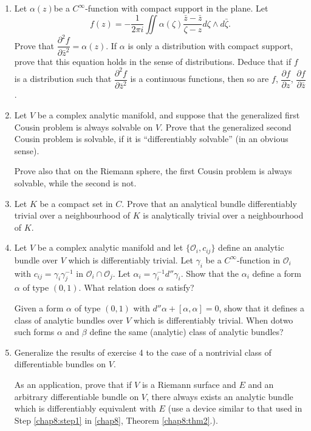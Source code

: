 \begin{enumerate}
\item Let $\alpha (z)$\pageoriginale be a $C^\infty$-function with
  compact support in the plane. Let  
$$
f(z) = - \frac{1}{2 \pi i} \iint \alpha (\zeta) \frac{\bar{z} -
  \bar{z}}{\zeta - z} d \zeta \wedge d \bar{\zeta}. 
$$
Prove that $\dfrac{\partial^2 f}{\partial \bar{z}^2} = \alpha (z)$. If
$\alpha$ is only a distribution with compact support, prove that this
equation holds in the sense of distributions. Deduce that if $f$ is a
distribution such that $\dfrac{\partial^2 f}{\partial \bar{z}^2}$ is a
continuous functions, then so are $f$, $\dfrac{\partial f}{\partial
  z}$, $\dfrac{\partial f}{\partial \bar{z}}$. 

\item Let $V$ be a complex analytic manifold, and suppose that the
  generalized first  Cousin problem is always solvable on $V$. Prove
  that the generalized second Cousin problem is solvable, if it is
  ``differentiably solvable'' (in an obvious sense). 

Prove also that on the Riemann sphere, the first Cousin problem is
always solvable, while the second is not.

\item Let $K$ be a compact set in $C$. Prove that an analytical bundle
  differentiably trivial over a neighbourhood of $K$ is analytically
  trivial over a neighbourhood of $K$. 

\item Let $V$ be a complex analytic manifold and let
  $\{\mathscr{O}_i, c_{ij}\}$ define an analytic bundle over $V$ which
  is differentiably trivial. Let $\gamma_i$ be a $C^\infty$-function
  in $\mathscr{O}_i$ with $c_{ij} = \gamma_i \gamma^{-1}_j$ in
  $\mathscr{O}_i \cap \mathscr{O}_j$. Let $\alpha_i = \gamma^{-1}_i
  d'' \gamma_i$. Show that the $\alpha_i$ define a form $\alpha$ of
  type $(0,1)$. What relation does $\alpha$ satisfy?

Given a form $\alpha$ of type $(0,1)$ with $d'' \alpha + [\alpha,
  \alpha] =0$, show that it defines a class of analytic bundles over
$V$ which is differentiably trivial. When do\pageoriginale two such
forms $\alpha$ and $\beta$ define the same (analytic) class of
analytic bundles?

\item Generalize the results of exercise 4 to the case of a nontrivial
  class of differentiable bundles on $V$. 

As an application, prove that if $V$ is a Riemann surface and $E$ and
an arbitrary differentiable bundle on $V$, there always exists an
analytic bundle which is differentiably equivalent with $E$ (use a
device similar to that used in Step \ref{chap8:step1} in \ref{chap8},
Theorem \ref{chap8:thm2}.). 
\end{enumerate}

